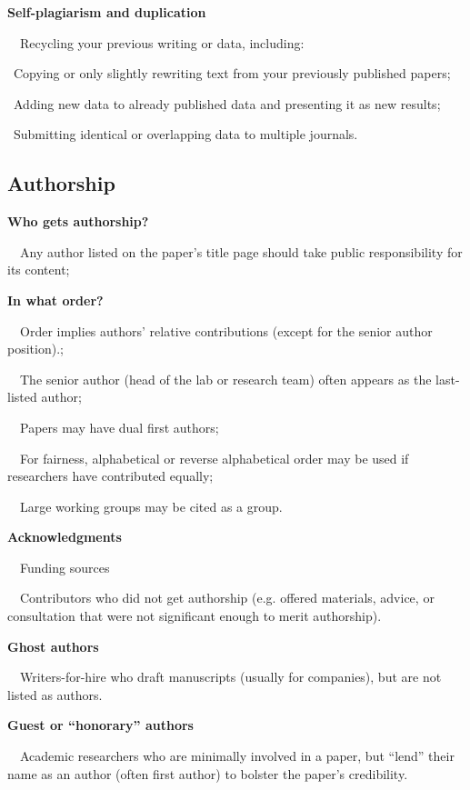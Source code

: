 \documentclass[a4paper, 12pt]{article}
\begin{document}
\textbf{Self-plagiarism and duplication}
\par\ \textbullet\ Recycling your previous writing or data, including:
\par\quad\textopenbullet\ Copying or only slightly rewriting text from your previously published papers;
\par\quad\textopenbullet\ Adding new data to already published data and presenting it as new results;
\par\quad\textopenbullet\ Submitting identical or overlapping data to multiple journals.

\newpage\subsection{Authorship}

\textbf{Who gets authorship?}
\par\ \textbullet\ Any author listed on the paper's title page should take public responsibility for its content;

\textbf{In what order?}
\par\ \textbullet\ Order implies authors' relative contributions (except for the senior author position).;
\par\ \textbullet\ The senior author (head of the lab or research team) often appears as the last-listed author;
\par\ \textbullet\ Papers may have dual first authors;
\par\ \textbullet\ For fairness, alphabetical or reverse alphabetical order may be used if researchers have contributed equally;
\par\ \textbullet\ Large working groups may be cited as a group.

\textbf{Acknowledgments}
\par\ \textbullet\  Funding sources
\par\ \textbullet\ Contributors who did not get authorship (e.g. offered materials, advice, or consultation that were not significant enough to merit authorship).

\textbf{Ghost authors}
\par\ \textbullet\ Writers-for-hire who draft manuscripts (usually for companies), but are not listed as authors.

\textbf{Guest or ``honorary'' authors}
\par\ \textbullet\ Academic researchers who are minimally involved in a paper, but ``lend'' their name as an author (often first author) to bolster the paper's credibility.
\end{document}
